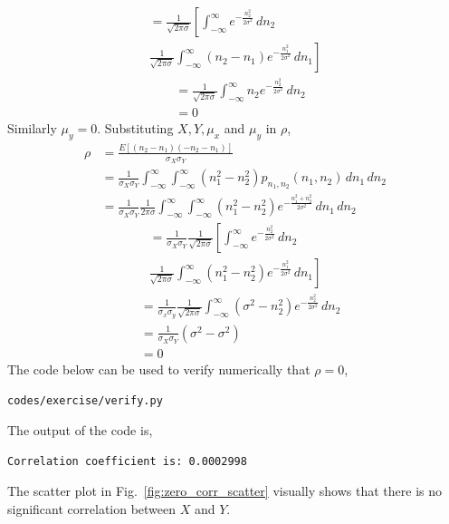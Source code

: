 \documentclass[journal,8pt,onecolumn]{IEEEtran}
\newcommand\figref{Fig.~\ref}
\providecommand{\sbrak}[1]{\ensuremath{{}\left[#1\right]}}
\providecommand{\brak}[1]{\ensuremath{\left(#1\right)}}
\begin{document}
\begin{enumerate}
\begin{enumerate}[label=(\alph{enumii})]
\begin{multline*}
	= \frac{1}{\sqrt{2\pi \sigma}}\left[ \int_{-\infty}^{\infty} e^{-\frac{n_2^2}{2\sigma^2}} \,dn_2 \right.\\
	\left. \frac{1}{\sqrt{2\pi \sigma}}\int_{-\infty}^{\infty} \brak{n_2-n_1} e^{-\frac{n_1^2}{2\sigma^2}} \,dn_1\right]
\end{multline*}
\begin{align*}
	&= \frac{1}{\sqrt{2\pi \sigma}} \int_{-\infty}^{\infty} n_2 e^{-\frac{n_2^2}{2\sigma^2}} \,dn_2\\
	&= 0
\end{align*} 
Similarly $\mu_y = 0$. Substituting $X, Y, \mu_x$ and $\mu_y$ in $\rho$,
\begin{align*}
	\rho &= \frac{E\sbrak{\brak{n_2-n_1}\brak{-n_2-n_1}}}{\sigma_X\sigma_Y}\\
	&= \frac{1}{\sigma_X \sigma_Y} \int_{-\infty}^{\infty} \int_{-\infty}^{\infty} \brak{n_1^2-n_2^2}p_{n_1,n_2}\brak{n_1,n_2}  \,dn_1  \,dn_2\\
	&= \frac{1}{\sigma_X \sigma_Y} \frac{1}{2\pi\sigma} \int_{-\infty}^{\infty} \int_{-\infty}^{\infty} \brak{n_1^2-n_2^2} e^{-\frac{n_1^2+n_2^2}{2\sigma^2}} \,dn_1  \,dn_2
\end{align*}
\begin{multline*}
	= \frac{1}{\sigma_X \sigma_Y} \frac{1}{\sqrt{2\pi \sigma}}\left[ \int_{-\infty}^{\infty} e^{-\frac{n_2^2}{2\sigma^2}} \,dn_2\right. \\
	\left. \frac{1}{\sqrt{2\pi \sigma}}\int_{-\infty}^{\infty} \brak{n_1^2-n_2^2} e^{-\frac{n_1^2}{2\sigma^2}} \,dn_1\right]
\end{multline*}
\begin{align*}
	&= \frac{1}{\sigma_x \sigma_y} \frac{1}{\sqrt{2\pi \sigma}} \int_{-\infty}^{\infty} \brak{\sigma^2-n_2^2} e^{-\frac{n_2^2}{2\sigma^2}} \,dn_2\\
	&= \frac{1}{\sigma_X \sigma_Y} \brak{\sigma^2-\sigma^2}\\
	&= 0
\end{align*}
The code below can be used to verify numerically that $\rho = 0$,
\begin{lstlisting}
codes/exercise/verify.py
\end{lstlisting}
The output of the code is,
\begin{lstlisting}
Correlation coefficient is: 0.0002998	
\end{lstlisting}
The scatter plot in \figref{fig:zero_corr_scatter} visually shows that there is no significant correlation between $X$ and $Y$.

\end{enumerate}
\end{enumerate}
\end{document}
